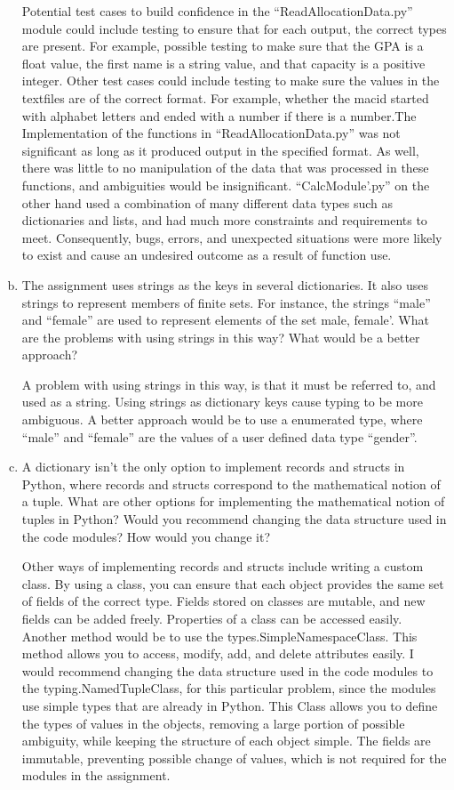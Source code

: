 \documentclass[12pt]{article}
\begin{document}
\begin{enumerate}[(a)]
Potential test cases to build confidence in the ``ReadAllocationData.py'' module could include testing to ensure that for each output, the correct types are present. For example, possible testing to make sure that the GPA is a float value, the first name is a string value, and that capacity is a positive integer. Other test cases could include testing to make sure the values in the textfiles are of the correct format. For example, whether the macid started with alphabet letters and ended with a number if there is a number.The Implementation of the functions in ``ReadAllocationData.py'' was not significant as long as it produced output in the specified format. As well, there was little to no manipulation of the data that was processed in these functions, and ambiguities would be insignificant. ``CalcModule'.py'' on the other hand used a combination of many different data types such as dictionaries and lists, and had much more constraints and requirements to meet. Consequently, bugs, errors, and unexpected situations were more likely to exist and cause an undesired outcome as a result of function use.

\item The assignment uses strings as the keys in several dictionaries. It also uses strings to represent members of finite sets. For instance, the strings ``male'' and ``female'' are used to represent elements of the set {male, female'}. What are the problems with using strings in this way? What would be a better approach?

A problem with using strings in this way, is that it must be referred to, and used as a string. Using strings as dictionary keys cause typing to be more ambiguous. A better approach would be to use a enumerated type, where ``male'' and ``female'' are the values of a user defined data type ``gender''. 

\item A dictionary isn't the only option to implement records and structs in Python, where records and structs correspond to the mathematical notion of a tuple. What are other options for implementing the mathematical notion of tuples in Python? Would you recommend changing the data structure used in the code modules? How would you change it?

Other ways of implementing records and structs include writing a custom class. By using a class, you can ensure that each object provides the same set of fields of the correct type. Fields stored on classes are mutable, and new fields can be added freely. Properties of a class can be accessed easily. Another method would be to use the types.SimpleNamespaceClass. This method allows you to access, modify, add, and delete attributes easily. I would recommend changing the data structure used in the code modules to the typing.NamedTupleClass, for this particular problem, since the modules use simple types that are already in Python. This Class allows you to define the types of values in the objects, removing a large portion of possible ambiguity, while keeping the structure of each object simple. The fields are immutable, preventing possible change of values, which is not required for the modules in the assignment.


\end{enumerate}
\end{document}
